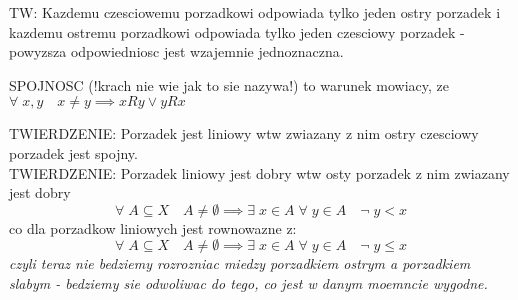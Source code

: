 \documentclass{article}
\begin{document}
    {\color{emp}TW}: Kazdemu czesciowemu porzadkowi odpowiada tylko jeden ostry porzadek i kazdemu ostremu porzadkowi odpowiada tylko jeden czesciowy porzadek - {\color{acc}powyzsza odpowiedniosc jest wzajemnie jednoznaczna}.\bigskip
    \begin{center}\large
        {\color{def}SPOJNOSC} ({\color{tit}!krach nie wie jak to sie nazywa!}) to warunek mowiacy, ze\smallskip\\
        $\forall\;x,y\quad x\neq y\implies xRy\lor yRx$
    \end{center}
    {\color{emp}\large TWIERDZENIE}: Porzadek jest liniowy wtw zwiazany z nim ostry czesciowy porzadek jest spojny.\bigskip\\
    {\color{emp}\large TWIERDZENIE}: Porzadek liniowy jest dobry wtw osty porzadek z nim zwiazany jest dobry
    $$\forall\;A\subseteq X\quad A\neq\emptyset\implies\exists\;x\in A\;\forall\;y\in A\quad \neg \;y<x$$
    co dla porzadkow liniowych jest rownowazne z:
    $$\forall\;A\subseteq X\quad A\neq\emptyset\implies\exists\;x\in A\;\forall\;y\in A\quad \neg \;y\leq x$$
    \emph{czyli teraz nie bedziemy rozrozniac miedzy porzadkiem ostrym a porzadkiem slabym - bedziemy sie odwoliwac do tego, co jest w danym moemncie wygodne.}
\end{document}
